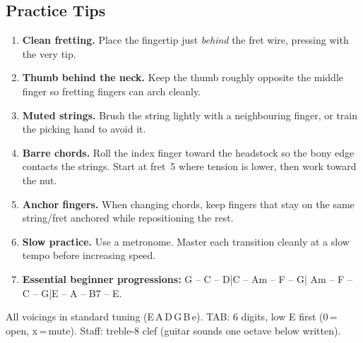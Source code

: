 \documentclass[a4paper,10pt]{article}
\begin{document}
\begin{samepage}
\section{Practice Tips}
\begin{mdframed}[backgroundcolor=lightnavy, linecolor=navy,
                 linewidth=0.8pt, innerleftmargin=10pt,
                 innerrightmargin=10pt, innertopmargin=8pt,
                 innerbottommargin=8pt]
\small\begin{enumerate}[nosep, leftmargin=1.6em]
  \item \textbf{Clean fretting.} Place the fingertip just \emph{behind}
    the fret wire, pressing with the very tip.
  \item \textbf{Thumb behind the neck.} Keep the thumb roughly opposite
    the middle finger so fretting fingers can arch cleanly.
  \item \textbf{Muted strings.} Brush the string lightly with a
    neighbouring finger, or train the picking hand to avoid it.
  \item \textbf{Barre chords.} Roll the index finger toward the headstock
    so the bony edge contacts the strings. Start at fret~5 where tension
    is lower, then work toward the nut.
  \item \textbf{Anchor fingers.} When changing chords, keep fingers that
    stay on the same string/fret anchored while repositioning the rest.
  \item \textbf{Slow practice.} Use a metronome. Master each transition
    cleanly at a slow tempo before increasing speed.
  \item \textbf{Essential beginner progressions:}
    G -- C -- D\quad|\quad C -- Am -- F -- G\quad|\quad
    Am -- F -- C -- G\quad|\quad E -- A -- B7 -- E.
\end{enumerate}
\end{mdframed}
\end{samepage}

\begin{center}\small\color{mygray}
  All voicings in standard tuning (E\,A\,D\,G\,B\,e).
  TAB: 6 digits, low E first (0\,=\,open, x\,=\,mute).
  Staff: treble-8 clef (guitar sounds one octave below written).
\end{center}

\label{fin-pratique}
\end{document}
